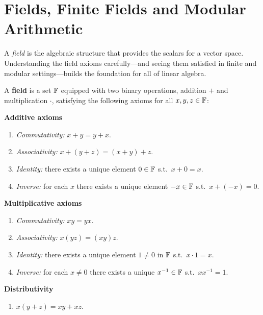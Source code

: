 \section{Fields, Finite Fields and Modular Arithmetic}

A \emph{field} is the algebraic structure that provides the scalars for a vector
space.  Understanding the field axioms carefully—and seeing them satisfied in
finite and modular settings—builds the foundation for all of linear algebra.

\begin{defbox}
A \textbf{field} is a set $\mathbb{F}$ equipped with two binary operations, addition
$+$ and multiplication $\cdot$, satisfying the following axioms for all
$x,y,z\in\mathbb{F}$:

\medskip
\textbf{Additive axioms}
\begin{enumerate}[label=A\arabic*.]
    \item \textit{Commutativity:} $x+y=y+x$.
    \item \textit{Associativity:} $x+(y+z)=(x+y)+z$.
    \item \textit{Identity:} there exists a unique element $0\in\mathbb{F}$ s.t.\ $x+0=x$.
    \item \textit{Inverse:} for each $x$ there exists a unique element $-x\in\mathbb{F}$
          s.t.\ $x+(-x)=0$.
\end{enumerate}

\medskip
\textbf{Multiplicative axioms}
\begin{enumerate}[label=M\arabic*.]
    \item \textit{Commutativity:} $xy=yx$.
    \item \textit{Associativity:} $x(yz)=(xy)z$.
    \item \textit{Identity:} there exists a unique element $1\neq 0$ in $\mathbb{F}$
          s.t.\ $x\cdot 1=x$.
    \item \textit{Inverse:} for each $x\neq 0$ there exists a unique $x^{-1}\in\mathbb{F}$
          s.t.\ $xx^{-1}=1$.
\end{enumerate}

\medskip
\textbf{Distributivity}
\begin{enumerate}[label=D.]
    \item $x(y+z)=xy+xz$.
\end{enumerate}
\end{defbox}


